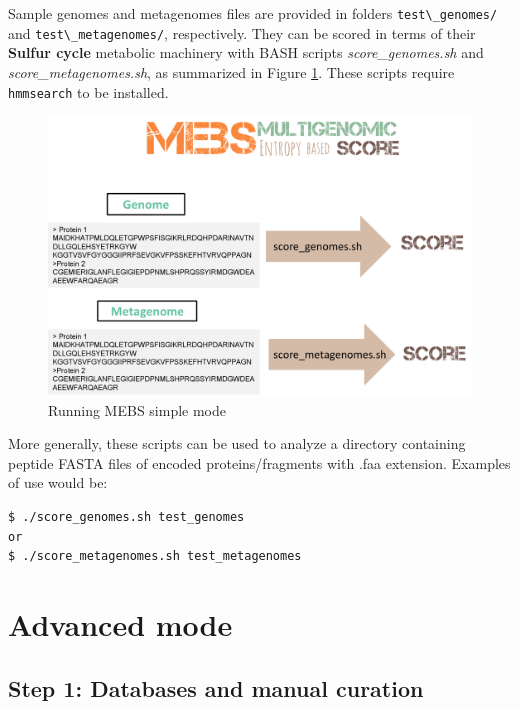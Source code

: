 \documentclass[12pt]{report}
\begin{document}
Sample genomes and metagenomes files are provided in folders \verb+test\_genomes/+ and \verb+test\_metagenomes/+, respectively. They can be scored in terms of their \textbf{Sulfur cycle} metabolic machinery with BASH scripts \textit{score\_genomes.sh} and \textit{score\_metagenomes.sh}, as  summarized in Figure \ref{fig:mebs_simple}. These scripts require \verb+hmmsearch+ to be installed.

\begin{figure}[H]
  \centering
    \includegraphics[scale=0.5]{Usage1.png}
    \caption{Running MEBS simple mode}
        \label{fig:mebs_simple}
\end{figure}

More generally, these scripts can be used to analyze a directory containing peptide FASTA files of encoded proteins/fragments with .faa extension. Examples of use would be:

\begin{verbatim}
$ ./score_genomes.sh test_genomes
or
$ ./score_metagenomes.sh test_metagenomes
\end{verbatim}

\section{Advanced mode}

\subsection{Step 1: Databases and manual curation}
\label{stage1}
\end{document}
